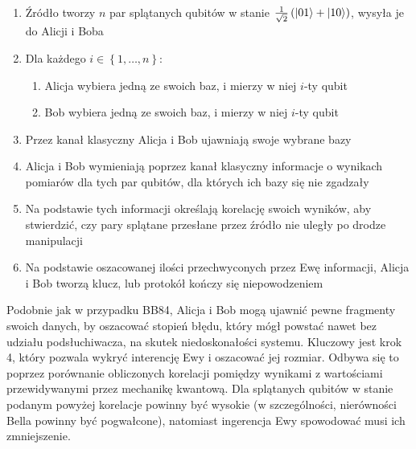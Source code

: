 \documentclass[10pt]{article}
\begin{document}
\begin{enumerate}
  \item Źródło tworzy \(n\) par splątanych qubitów w stanie \(\frac{1}{\sqrt{2}}\left(\Ket{01}+
    \Ket{10}\right)\), wysyła je do Alicji i Boba
  \item Dla każdego \(i\in\left\{1,\ldots,n\right\}\):
    \begin{enumerate}
      \item Alicja wybiera jedną ze swoich baz, i mierzy w niej \(i\)-ty qubit
      \item Bob wybiera jedną ze swoich baz, i mierzy w niej \(i\)-ty qubit
    \end{enumerate}
  \item Przez kanał klasyczny Alicja i Bob ujawniają swoje wybrane bazy
  \item Alicja i Bob wymieniają poprzez kanał klasyczny informacje o wynikach pomiarów dla tych
    par qubitów, dla których ich bazy się nie zgadzały
  \item Na podstawie tych informacji określają korelację swoich wyników, aby stwierdzić, czy pary
    splątane przesłane przez źródło nie uległy po drodze manipulacji
  \item Na podstawie oszacowanej ilości przechwyconych przez Ewę informacji, Alicja i Bob tworzą
    klucz, lub protokół kończy się niepowodzeniem 
\end{enumerate}

Podobnie jak w przypadku BB84, Alicja i Bob mogą ujawnić pewne fragmenty swoich danych, by oszacować
stopień błędu, który mógł powstać nawet bez udziału podsłuchiwacza, na skutek niedoskonałości systemu.
Kluczowy jest krok 4, który pozwala wykryć interencję Ewy i oszacować jej rozmiar. Odbywa się to
poprzez porównanie obliczonych korelacji pomiędzy wynikami z wartościami przewidywanymi przez mechanikę
kwantową. Dla splątanych qubitów w stanie podanym powyżej korelacje powinny być wysokie (w szczególności,
nierówności Bella powinny być pogwałcone), natomiast ingerencja Ewy spowodować musi ich zmniejszenie.

\nocite{*}



\end{document}
